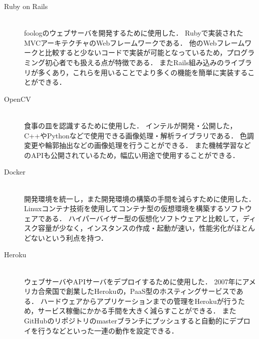 \documentclass[../report]{subfiles}
\begin{document}
\begin{description}
  \item[Ruby on Rails] \mbox{} \\
    foologのウェブサーバを開発するために使用した．
    Rubyで実装されたMVCアーキテクチャのWebフレームワークである．
    他のWebフレームワークと比較すると少ないコードで実装が可能となっているため，プログラミング初心者でも扱える点が特徴である．
    またRails組み込みのライブラリが多くあり，これらを用いることでより多くの機能を簡単に実装することができる．

  \item[OpenCV] \mbox{} \\
    食事の皿を認識するために使用した．
    インテルが開発・公開した，C++やPythonなどで使用できる画像処理・解析ライブラリである．
    色調変更や輪郭抽出などの画像処理を行うことができる．
    また機械学習などのAPIも公開されているため，幅広い用途で使用することができる．

  \item[Docker] \mbox{} \\
    開発環境を統一し，また開発環境の構築の手間を減らすために使用した．
    Linuxコンテナ技術を使用してコンテナ型の仮想環境を構築するソフトウェアである．
    ハイパーバイザー型の仮想化ソフトウェアと比較して，ディスク容量が少なく，インスタンスの作成・起動が速い，性能劣化がほとんどないという利点を持つ．

  \item[Heroku] \mbox{} \\
    ウェブサーバやAPIサーバをデプロイするために使用した．
    2007年にアメリカ合衆国で創業したHerokuの，PaaS型のホスティングサービスである．
    ハードウェアからアプリケーションまでの管理をHerokuが行うため，サービス稼働にかかる手間を大きく減らすことができる．
    またGitHubのリポジトリのmasterブランチにプッシュすると自動的にデプロイを行うなどといった一連の動作を設定できる．
\end{description}
\end{document}
